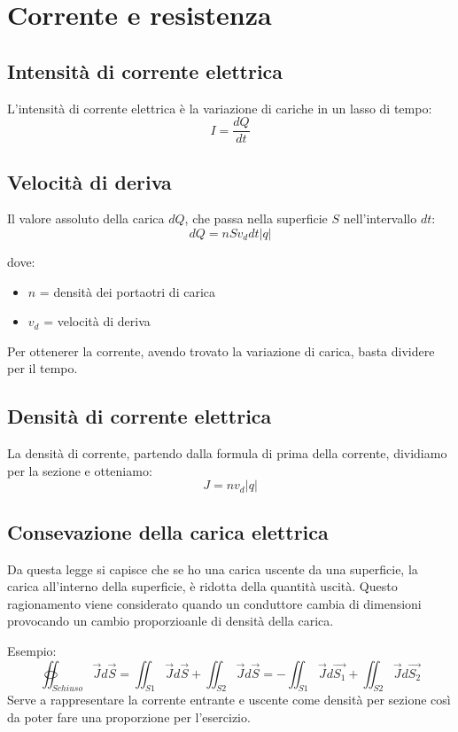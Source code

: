 \section{Corrente e resistenza}
\subsection{Intensità di corrente elettrica}
L'intensità di corrente elettrica è la variazione di cariche in un
lasso di tempo:
\begin{equation*}
    I = \frac{dQ}{dt}
\end{equation*}

\subsection{Velocità di deriva}
Il valore assoluto della carica $dQ$, che passa nella superficie $S$
nell'intervallo $dt$:
\begin{equation*}
    dQ = nSv_ddt|q|
\end{equation*}

dove:
\begin{itemize}
    \item $n$ = densità dei portaotri di carica
    \item $v_d$ = velocità di deriva
\end{itemize}

Per ottenerer la corrente, avendo trovato la variazione di carica, 
basta dividere per il tempo.

\subsection{Densità di corrente elettrica}
La densità di corrente, partendo dalla formula di prima della corrente,
dividiamo per la sezione e otteniamo:
\begin{equation*}
    J = nv_d|q|
\end{equation*}

\subsection{Consevazione della carica elettrica}
Da questa legge si capisce che se ho una carica uscente da una superficie,
la carica all'interno della superficie, è ridotta della quantità
uscità.
Questo ragionamento viene considerato quando un conduttore cambia di dimensioni
 provocando un cambio proporzioanle di densità della carica.

 Esempio:
 \begin{equation*}
     \oiint_{Schiuso}{\vec{J}d\vec{S}} =
     \iint_{S1}{\vec{J}d\vec{S}} + 
     \iint_{S2}{\vec{J}d\vec{S}} =
     - \iint_{S1}{\vec{J}d\vec{S_1}} + 
     \iint_{S2}{\vec{J}d\vec{S_2}} 
 \end{equation*}
 Serve a rappresentare la corrente entrante e uscente come densità per sezione
 così da poter fare una proporzione per l'esercizio.


